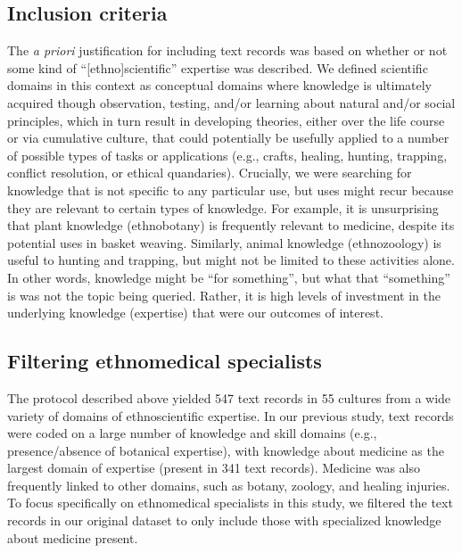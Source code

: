 \documentclass[
]{article}
\begin{document}
\hypertarget{inclusion-criteria}{%
\subsection{Inclusion criteria}\label{inclusion-criteria}}

The \emph{a priori} justification for including text records was based on whether or not some kind of ``{[}ethno{]}scientific'' expertise was described. We defined scientific domains in this context as conceptual domains where knowledge is ultimately acquired though observation, testing, and/or learning about natural and/or social principles, which in turn result in developing theories, either over the life course or via cumulative culture, that could potentially be usefully applied to a number of possible types of tasks or applications (e.g., crafts, healing, hunting, trapping, conflict resolution, or ethical quandaries). Crucially, we were searching for knowledge that is not specific to any particular use, but uses might recur because they are relevant to certain types of knowledge. For example, it is unsurprising that plant knowledge (ethnobotany) is frequently relevant to medicine, despite its potential uses in basket weaving. Similarly, animal knowledge (ethnozoology) is useful to hunting and trapping, but might not be limited to these activities alone. In other words, knowledge might be ``for something'', but what that ``something'' is was not the topic being queried. Rather, it is high levels of investment in the underlying knowledge (expertise) that were our outcomes of interest.

\hypertarget{filtering-ethnomedical-specialists}{%
\subsection{Filtering ethnomedical specialists}\label{filtering-ethnomedical-specialists}}

The protocol described above yielded 547 text records in 55 cultures from a wide variety of domains of ethnoscientific expertise. In our previous study, text records were coded on a large number of knowledge and skill domains (e.g., presence/absence of botanical expertise), with knowledge about medicine as the largest domain of expertise (present in 341 text records). Medicine was also frequently linked to other domains, such as botany, zoology, and healing injuries. To focus specifically on ethnomedical specialists in this study, we filtered the text records in our original dataset to only include those with specialized knowledge about medicine present.
\end{document}
